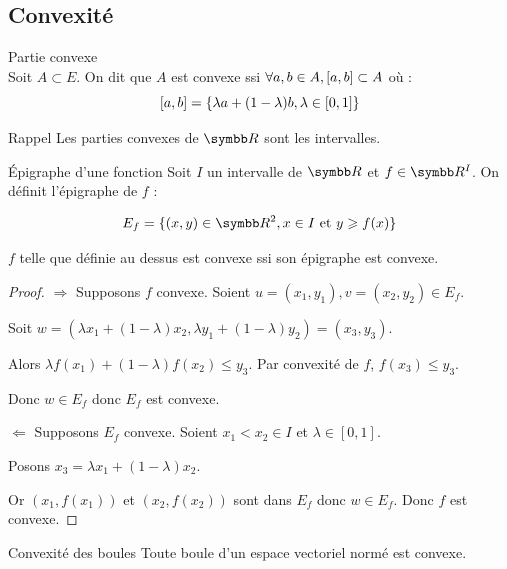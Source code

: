 \subsection{Convexité}

\begin{definition}{Partie convexe}{}
    \\Soit $A \subset E$. 
    On dit que $A$ est convexe ssi $\forall a, b \in A, \left[a, b\right] \subset A$ où :
    \[\left[a, b\right] = \{\lambda a + (1 - \lambda)b, \lambda \in [0, 1]\}\]
\end{definition}

\begin{theoreme}{Rappel}{}
    Les parties convexes de $\R$ sont les intervalles.
\end{theoreme}


\begin{definition}{Épigraphe d'une fonction}{}
    Soit $I$ un intervalle de $\R$ et $f \in \R^{I}$.
    On définit l'épigraphe de $f$ :

    \[ E_f = \{(x,y) \in \R^2, x \in I~\text{et}~y \geqslant f(x)\}\]     
\end{definition}

\begin{proposition}{}{}
    $f$ telle que définie au dessus est convexe ssi son épigraphe est convexe.
\end{proposition}

\begin{proof}
    $\Rightarrow$ Supposons $f$ convexe.
    Soient $u=(x_1,y_1), v=(x_2,y_2) \in E_f$.

    Soit $w = (\lambda x_1 + (1 - \lambda) x_2, \lambda y_1 + (1 - \lambda) y_2) = (x_3, y_3)$.

    Alors $\lambda f(x_1) + (1 - \lambda)f(x_2) \leqslant y_3$.
    Par convexité de $f$, $f(x_3) \leqslant y_3$.

    Donc $w \in E_f$ donc $E_f$ est convexe.

    $\Leftarrow$ Supposons $E_f$ convexe.
    Soient $x_1 < x_2 \in I$ et $\lambda \in [0,1]$.

    Posons $x_3 = \lambda x_1 + (1 - \lambda) x_2$.

    Or $(x_1,f(x_1))$ et $(x_2,f(x_2))$ sont dans $E_f$ donc $w \in E_f$. Donc $f$ est convexe.
\end{proof}

\begin{proposition}{Convexité des boules}{}
    Toute boule d'un espace vectoriel normé est convexe. 
\end{proposition}


